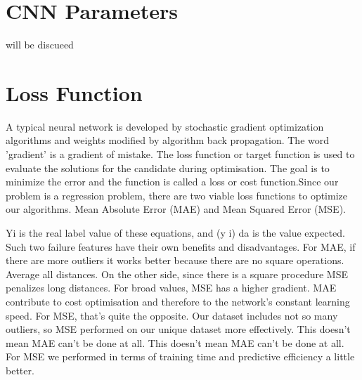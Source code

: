 \section{CNN Parameters}
will be discueed

\section{Loss Function}
A typical neural network is developed by stochastic gradient optimization algorithms and weights modified by algorithm back propagation. The word 'gradient' is a gradient of mistake. The loss function or target function is used to evaluate the solutions for the candidate during optimisation. The goal is to minimize the error and the function is called a loss or cost function.Since our problem is a regression problem, there are two viable loss functions to optimize our algorithms. Mean Absolute Error (MAE) and Mean Squared Error (MSE). 


Yi is the real label value of these equations, and (y i) da is the value expected. Such two failure features have their own benefits and disadvantages. For MAE, if there are more outliers it works better because there are no square operations. Average all distances. On the other side, since there is a square procedure MSE penalizes long distances. For broad values, MSE has a higher gradient. MAE contribute to cost optimisation and therefore to the network's constant learning speed. For MSE, that's quite the opposite. Our dataset includes not so many outliers, so MSE performed on our unique dataset more effectively. This doesn't mean MAE can't be done at all. This doesn't mean MAE can't be done at all. For MSE we performed in terms of training time and predictive efficiency a little better.

